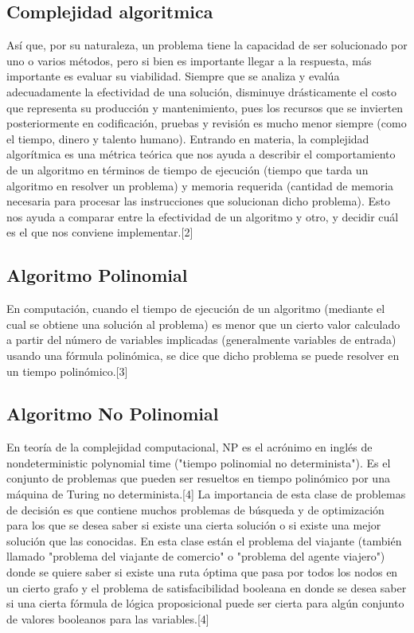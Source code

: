 \documentclass[spanish]{article}
\begin{document}
	\subsection{Complejidad algoritmica}
	Así que, por su naturaleza, un problema tiene la capacidad de ser solucionado por uno o varios métodos, pero si bien es importante llegar a la respuesta, más importante es evaluar su viabilidad. Siempre que se analiza y evalúa adecuadamente la efectividad de una solución, disminuye drásticamente el costo que representa su producción y mantenimiento, pues los recursos que se invierten posteriormente en codificación, pruebas y revisión es mucho menor siempre (como el tiempo, dinero y talento humano).	
	Entrando en materia, la complejidad algorítmica es una métrica teórica que nos ayuda a describir el comportamiento de un algoritmo en términos de tiempo de ejecución (tiempo que tarda un algoritmo en resolver un problema) y memoria requerida (cantidad de memoria necesaria para procesar las instrucciones que solucionan dicho problema). Esto nos ayuda a comparar entre la efectividad de un algoritmo y otro, y decidir cuál es el que nos conviene implementar.[2]
	\subsection{Algoritmo Polinomial}
	En computación, cuando el tiempo de ejecución de un algoritmo (mediante el cual se obtiene una solución al problema) es menor que un cierto valor calculado a partir del número de variables implicadas (generalmente variables de entrada) usando una fórmula polinómica, se dice que dicho problema se puede resolver en un tiempo polinómico.[3]	
	\subsection{Algoritmo No Polinomial}
	En teoría de la complejidad computacional, NP es el acrónimo en inglés de nondeterministic polynomial time ("tiempo polinomial no determinista"). Es el conjunto de problemas que pueden ser resueltos en tiempo polinómico por una máquina de Turing no determinista.[4]
	La importancia de esta clase de problemas de decisión es que contiene muchos problemas de búsqueda y de optimización para los que se desea saber si existe una cierta solución o si existe una mejor solución que las conocidas. En esta clase están el problema del viajante (también llamado "problema del viajante de comercio" o "problema del agente viajero") donde se quiere saber si existe una ruta óptima que pasa por todos los nodos en un cierto grafo y el problema de satisfacibilidad booleana en donde se desea saber si una cierta fórmula de lógica proposicional puede ser cierta para algún conjunto de valores booleanos para las variables.[4]
\end{document}
